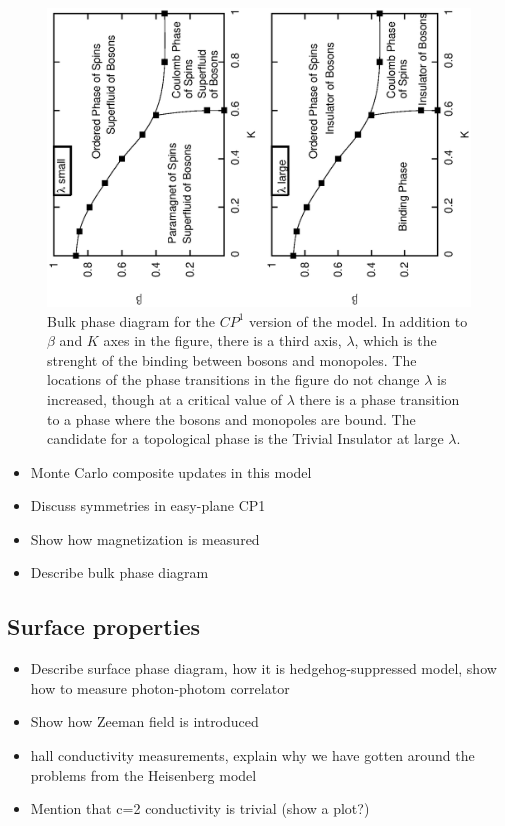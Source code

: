 \documentclass[prb,twocolumn]{revtex4}
\begin{document}
\begin{figure}
\includegraphics[angle=-90,width=0.9\linewidth]{figures/cp1bulkphase.eps}
\caption{Bulk phase diagram for the $CP^1$ version of the model. In addition to $\beta$ and $K$ axes in the figure, there is a third axis, $\lambda$, which is the strenght of the binding between bosons and monopoles. The locations of the phase transitions in the figure do not change $\lambda$ is increased, though at a critical value of $\lambda$ there is a phase transition to a phase where the bosons and monopoles are bound. The candidate for a topological phase is the Trivial Insulator at large $\lambda$.}
\label{cp1bulkphase}
\end{figure}

\begin{itemize}
\item Monte Carlo composite updates in this model
\item Discuss symmetries in easy-plane CP1
\item Show how magnetization is measured
\item Describe bulk phase diagram
\end{itemize}
\subsection{Surface properties}

\begin{itemize}
\item Describe surface phase diagram, how it is hedgehog-suppressed model, show how to measure photon-photom correlator
\item Show how Zeeman field is introduced
\item hall conductivity measurements, explain why we have gotten around the problems from the Heisenberg model
\item Mention that c=2 conductivity is trivial (show a plot?)
\end{itemize}
\end{document}

